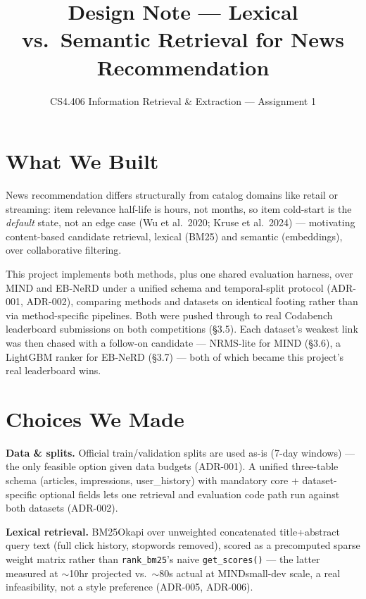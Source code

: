\documentclass[10.5pt]{article}
\title{\vspace{-1.5em}Design Note --- Lexical vs.\ Semantic Retrieval for News Recommendation\vspace{-0.5em}}
\author{\small CS4.406 Information Retrieval \& Extraction --- Assignment 1}
\date{}
\begin{document}
\maketitle
\vspace{-2em}

\section{What We Built}

News recommendation differs structurally from catalog domains like retail
or streaming: item relevance half-life is hours, not months, so item
cold-start is the \emph{default} state, not an edge case (Wu et al.\ 2020;
Kruse et al.\ 2024) --- motivating content-based candidate retrieval,
lexical (BM25) and semantic (embeddings), over collaborative filtering.

This project implements both methods, plus one shared evaluation harness,
over MIND and EB-NeRD under a unified schema and temporal-split protocol
(ADR-001, ADR-002), comparing methods and datasets on identical footing
rather than via method-specific pipelines. Both were pushed through to
real Codabench leaderboard submissions on both competitions (\S3.5). Each
dataset's weakest link was then chased with a follow-on candidate ---
NRMS-lite for MIND (\S3.6), a LightGBM ranker for EB-NeRD (\S3.7) --- both
of which became this project's real leaderboard wins.

\section{Choices We Made}

\textbf{Data \& splits.} Official train/validation splits are used as-is
(7-day windows) --- the only feasible option given data budgets (ADR-001).
A unified three-table schema (articles, impressions, user\_history) with
mandatory core + dataset-specific optional fields lets one retrieval and
evaluation code path run against both datasets (ADR-002).

\textbf{Lexical retrieval.} BM25Okapi over unweighted concatenated
title+abstract query text (full click history, stopwords removed), scored
as a precomputed sparse weight matrix rather than \texttt{rank\_bm25}'s
naive \texttt{get\_scores()} --- the latter measured at $\sim$10hr projected
vs.\ $\sim$80s actual at MINDsmall-dev scale, a real infeasibility, not a
style preference (ADR-005, ADR-006).
\end{document}
